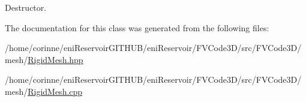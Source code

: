 Destructor. 



The documentation for this class was generated from the following files\+:\begin{DoxyCompactItemize}
\item 
/home/corinne/eni\+Reservoir\+G\+I\+T\+H\+U\+B/eni\+Reservoir/\+F\+V\+Code3\+D/src/\+F\+V\+Code3\+D/mesh/\hyperlink{RigidMesh_8hpp}{Rigid\+Mesh.\+hpp}\item 
/home/corinne/eni\+Reservoir\+G\+I\+T\+H\+U\+B/eni\+Reservoir/\+F\+V\+Code3\+D/src/\+F\+V\+Code3\+D/mesh/\hyperlink{RigidMesh_8cpp}{Rigid\+Mesh.\+cpp}\end{DoxyCompactItemize}
